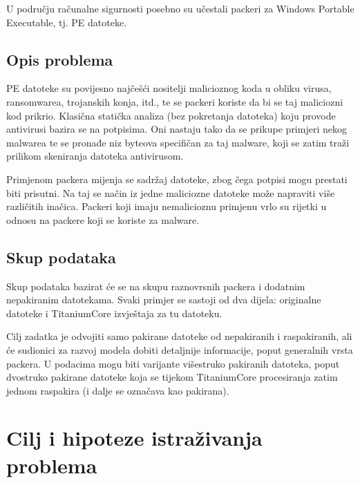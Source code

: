 \documentclass[paper=a4, fontsize=11pt]{scrartcl} %
\numberwithin{equation}{section} %
\numberwithin{figure}{section} %
\numberwithin{table}{section} %
\begin{document}
U području računalne sigurnosti posebno su učestali packeri za Windows Portable Executable, tj. PE datoteke.

\vspace{3mm}

\subsection{Opis problema}

PE datoteke su povijesno najčešći nositelji malicioznog koda u obliku virusa, ransomwarea,
trojanskih konja, itd., te se packeri koriste da bi se taj maliciozni kod prikrio. Klasična statička
analiza (bez pokretanja datoteka) koju provode antivirusi bazira se na potpisima. Oni nastaju
tako da se prikupe primjeri nekog malwarea te se pronađe niz byteova specifičan za taj malware, koji se zatim traži prilikom skeniranja datoteka antivirusom.


\vspace{3mm}


Primjenom packera mijenja se sadržaj datoteke, zbog čega potpisi mogu prestati biti prisutni.
Na taj se način iz jedne maliciozne datoteke može napraviti više različitih inačica. Packeri koji
imaju nemalicioznu primjenu vrlo su rijetki u odnosu na packere koji se koriste za malware.

\subsection{Skup podataka}

Skup podataka bazirat će se na skupu raznovrsnih packera i dodatnim nepakiranim
datotekama. Svaki primjer se sastoji od dva dijela: originalne datoteke i TitaniumCore
izvještaja za tu datoteku.

\vspace{3mm}

Cilj zadatka je odvojiti samo pakirane datoteke od nepakiranih i raspakiranih, ali će sudionici za
razvoj modela dobiti detaljnije informacije, poput generalnih vrsta packera. U podacima mogu
biti varijante višestruko pakiranih datoteka, poput dvostruko pakirane datoteke koja se tijekom
TitaniumCore procesiranja zatim jednom raspakira (i dalje se označava kao pakirana).

\section{Cilj i hipoteze istraživanja problema}


\iffalse
\end{document}
